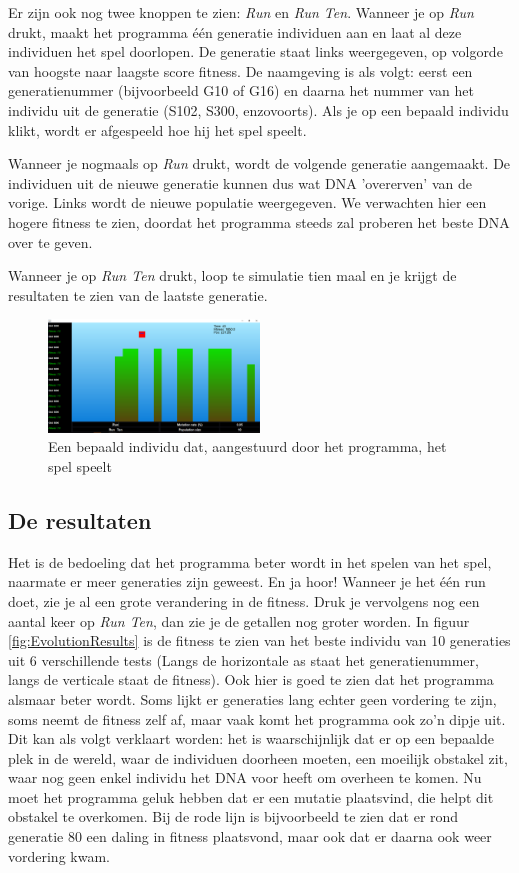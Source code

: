 \documentclass[a4paper,titlepage]{article}
\begin{document}
Er zijn ook nog twee knoppen te zien: \textit{Run} en \textit{Run Ten}. Wanneer je op \textit{Run} drukt, maakt het programma één generatie individuen aan en laat al deze individuen het spel doorlopen. De generatie staat links weergegeven, op volgorde van hoogste naar laagste score fitness. De naamgeving is als volgt: eerst een generatienummer (bijvoorbeeld G10 of G16) en daarna het nummer van het individu uit de generatie (S102, S300, enzovoorts). Als je op een bepaald individu klikt, wordt er afgespeeld hoe hij het spel speelt.

Wanneer je nogmaals op \textit{Run} drukt, wordt de volgende generatie aangemaakt. De individuen uit de nieuwe generatie kunnen dus wat DNA 'overerven' van de vorige. Links wordt de nieuwe populatie weergegeven. We verwachten hier een hogere fitness te zien, doordat het programma steeds zal proberen het beste DNA over te geven.

Wanneer je op \textit{Run Ten} drukt, loop te simulatie tien maal en je krijgt de resultaten te zien van de laatste generatie.


\begin{figure}[h]
  \centering
    \includegraphics[width=0.5\textwidth]{platformer2.png}
  \caption{Een bepaald individu dat, aangestuurd door het programma, het spel speelt}
  \label{fig:platformer1}
\end{figure}

\subsection{De resultaten}
Het is de bedoeling dat het programma beter wordt in het spelen van het spel, naarmate er meer generaties zijn geweest. En ja hoor! Wanneer je het één run doet, zie je al een grote verandering in de fitness. Druk je vervolgens nog een aantal keer op \textit{Run Ten}, dan zie je de getallen nog groter worden. In figuur \ref{fig:EvolutionResults} is de fitness te zien van het beste individu van 10 generaties uit 6 verschillende tests (Langs de horizontale as staat het generatienummer, langs de verticale staat de fitness). Ook hier is goed te zien dat het programma alsmaar beter wordt. Soms lijkt er generaties lang echter geen vordering te zijn, soms neemt de fitness zelf af, maar vaak komt het programma ook zo'n dipje uit. Dit kan als volgt verklaart worden: het is waarschijnlijk dat er op een bepaalde plek in de wereld, waar de individuen doorheen moeten, een moeilijk obstakel zit, waar nog geen enkel individu het DNA voor heeft om overheen te komen. Nu moet het programma geluk hebben dat er een mutatie plaatsvind, die helpt dit obstakel te overkomen. Bij de rode lijn is bijvoorbeeld te zien dat er rond generatie 80 een daling in fitness plaatsvond, maar ook dat er daarna ook weer vordering kwam.
\end{document}
